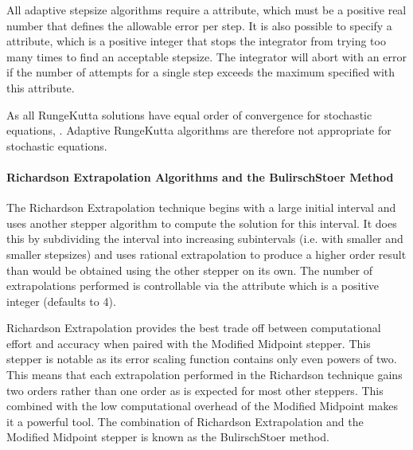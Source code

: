 \documentclass[letterpaper,10pt,english]{sphinxmanual}
\begin{document}
\sphinxAtStartPar
All adaptive stepsize algorithms require a  attribute, which must be a positive real number that defines the allowable error per step.  It is also possible to specify a  attribute, which is a positive integer that stops the integrator from trying too many times to find an acceptable stepsize.  The integrator will abort with an error if the number of attempts for a single step exceeds the maximum specified with this attribute.

\sphinxAtStartPar
As all Runge\sphinxhyphen{}Kutta solutions have equal order of convergence for stochastic equations, .  Adaptive Runge\sphinxhyphen{}Kutta algorithms are therefore not appropriate for stochastic equations.

\ignorespaces 

\paragraph{Richardson Extrapolation Algorithms and the Bulirsch\sphinxhyphen{}Stoer Method}
\label{\detokenize{reference_elements:richardson-extrapolation-algorithms-and-the-bulirsch-stoer-method}}\label{\detokenize{reference_elements:realgorithm}}\label{\detokenize{reference_elements:index-85}}
\sphinxAtStartPar
The Richardson Extrapolation technique begins with a large initial interval and uses another stepper algorithm to compute the solution for this interval. It does this by subdividing the interval into increasing subintervals (i.e. with smaller and smaller stepsizes) and uses rational extrapolation to produce a higher order result than would be obtained using the other stepper on its own. The number of extrapolations performed is controllable via the  attribute which is a positive integer (defaults to 4).

\sphinxAtStartPar
Richardson Extrapolation provides the best trade off between computational effort and accuracy when paired with the Modified Midpoint stepper. This stepper is notable as its error scaling function contains only even powers of two. This means that each extrapolation performed in the Richardson technique gains two orders rather than one order as is expected for most other steppers. This combined with the low computational overhead of the Modified Midpoint makes it a powerful tool. The combination of Richardson Extrapolation and the Modified Midpoint stepper is known as the Bulirsch\sphinxhyphen{}Stoer method.
\end{document}
